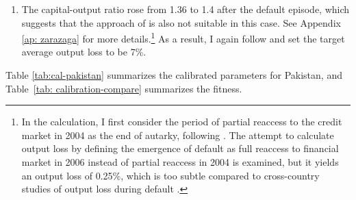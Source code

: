 \begin{enumerate}[label = (\roman*)]
{    }
    \item
    The capital-output ratio rose from 1.36 to 1.4 after the default episode, which suggests that the approach of \citet{zarazaga-12} is also not suitable in this case. See Appendix \ref{ap: zarazaga} for more details.\footnote{
        In the calculation, I first consider the period of partial reaccess to the credit market in 2004 as the end of autarky, following \citet{trebesch-2011-sovereign}. The attempt to calculate output loss by defining the emergence of default as full reaccess to financial market in 2006 instead of partial reaccess in 2004 is examined, but it yields an output loss of 0.25\%, which is too subtle compared to cross-country studies of output loss during default \citep{Borensztein-Panizza-defualt-cost}.
        }
    As a result, I again follow \citet{Na-18} and set the target average output loss to be 7\%.

\end{enumerate}
Table \ref{tab:cal-pakistan} summarizes the calibrated parameters for Pakistan, and Table~\ref{tab: calibration-compare} summarizes the fitness.
